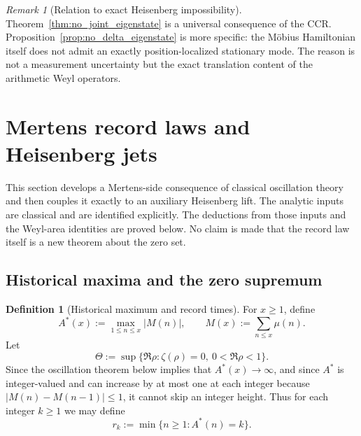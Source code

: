 \documentclass[11pt]{amsart}
\numberwithin{equation}{section}
\theoremstyle{plain}
\theoremstyle{definition}
\newtheorem{definition}[theorem]{Definition}
\theoremstyle{remark}
\newtheorem{remark}[theorem]{Remark}
\begin{document}
\begin{remark}[Relation to exact Heisenberg impossibility]
\label{rem:nonlocalization_relation}
Theorem~\ref{thm:no_joint_eigenstate} is a universal consequence of the CCR.
Proposition~\ref{prop:no_delta_eigenstate} is more specific: the M\"obius
Hamiltonian itself does not admit an exactly position-localized stationary
mode.  The reason is not a measurement uncertainty but the exact translation
content of the arithmetic Weyl operators.
\end{remark}


\section{Mertens record laws and Heisenberg jets}
\label{sec:mertens_records_heisenberg}

This section develops a Mertens-side consequence of classical oscillation
theory and then couples it exactly to an auxiliary Heisenberg lift.  The
analytic inputs are classical and are identified explicitly.  The deductions
from those inputs and the Weyl-area identities are proved below.  No claim is
made that the record law itself is a new theorem about the zero set.

\subsection{Historical maxima and the zero supremum}
\label{subsec:record_maximum_theta}

\begin{definition}[Historical maximum and record times]
\label{def:Astar_records}
For \(x\ge1\), define
\begin{equation}
A^*(x):=\max_{1\le n\le x}|M(n)|,
\qquad
M(x):=\sum_{n\le x}\mu(n).
\label{eq:Astar_definition}
\end{equation}
Let
\begin{equation}
\Theta:=\sup\{\Re\rho:\zeta(\rho)=0,\ 0<\Re\rho<1\}.
\label{eq:Theta_definition}
\end{equation}
Since the oscillation theorem below implies that \(A^*(x)\to\infty\), and since \(A^*\) is integer-valued and can increase by at most one at each integer because \(|M(n)-M(n-1)|\le1\), it cannot skip an integer height.  Thus for
each integer \(k\ge1\) we may define
\begin{equation}
r_k:=\min\{n\ge1:A^*(n)=k\}.
\label{eq:record_time_definition}
\end{equation}
\end{definition}
\end{document}
